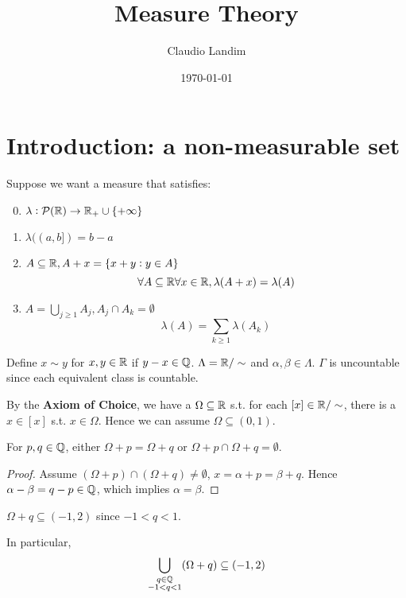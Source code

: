 \documentclass[11pt]{article}
\author{Claudio Landim}
\date{\today}
\title{Measure Theory}
\begin{document}
\maketitle
\tableofcontents \clearpage
\section{Introduction: a non-measurable set}
\label{sec:orgaf94a3a}
Suppose we want a measure that satisfies:
\begin{enumerate}
\setcounter{enumi}{-1}
\item \(\lambda:\mathcal{P}(\mathbb{R})\to\mathbb{R}_+\cup\{+\infty\}\)
\item \(\lambda((a,b])=b-a\)
\item \(A\subseteq\mathbb{R},A+x=\{x+y:y\in A\}\)
\begin{equation*}
\forall A\subseteq\mathbb{R}\forall x\in\mathbb{R},\lambda(A+x)=\lambda(A)
\end{equation*}
\item \(A=\bigcup_{j\ge 1}A_j,A_j\cap A_k=\emptyset\)
\begin{equation*}
\lambda(A)=\displaystyle\sum_{k\ge1}\lambda(A_k)
\end{equation*}
\end{enumerate}



Define \(x\sim y\) for \(x,y\in\mathbb{R}\) if \(y-x\in\mathbb{Q}\). \(\Lambda=\mathbb{R}/\sim\) and
\(\alpha,\beta\in\Lambda\). \(\Gamma\) is uncountable since each equivalent class
is countable.

By the \textbf{Axiom of Choice}, we have a \(\Omega\subseteq\mathbb{R}\) s.t. for each
\([x]\in\mathbb{R}/\sim\), there is a \(x\in[x]\) s.t. \(x\in\Omega\). Hence we can assume
\(\Omega\subseteq(0,1)\). 

\begin{claim}
For \(p,q\in\mathbb{Q}\), either \(\Omega+p=\Omega+q\) or
\(\Omega+p\cap\Omega+q=\emptyset\).
\end{claim}

\begin{proof}
Assume \((\Omega+p)\cap(\Omega+q)\neq\emptyset\), \(x=\alpha+p=\beta+q\). Hence
\(\alpha-\beta=q-p\in\mathbb{Q}\), which implies \(\alpha=\beta\).
\end{proof}

\begin{claim}
\(\Omega+q\subseteq(-1,2)\) since \(-1<q<1\).
\end{claim}

In particular,
\begin{equation*}
\displaystyle\bigcup_{\substack{q\in\mathbb{Q}\\-1<q<1}}(\Omega+q)\subseteq(-1,2)
\end{equation*}
\end{document}
